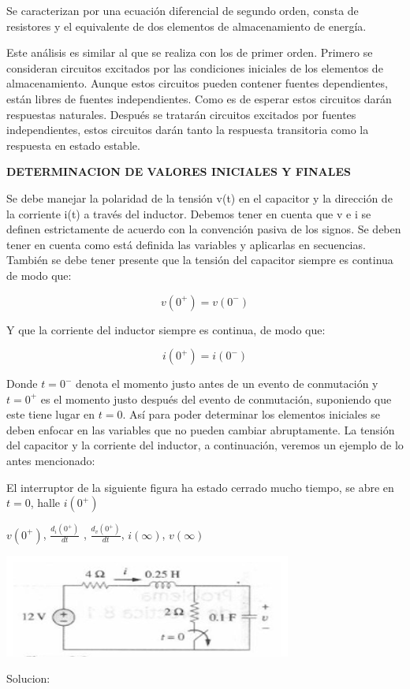 \documentclass[oneside,12pt]{report}
\begin{document}
Se caracterizan por una ecuación diferencial de segundo orden, consta de resistores y el equivalente de dos elementos de almacenamiento de energía.

Este análisis es similar al que se realiza con los de primer orden. Primero se consideran circuitos excitados por las condiciones iniciales de los elementos de almacenamiento. Aunque estos circuitos pueden contener fuentes dependientes, están libres de fuentes independientes. Como es de esperar estos circuitos darán respuestas naturales. Después se tratarán circuitos excitados por fuentes independientes, estos circuitos darán tanto la respuesta transitoria como la respuesta en estado estable.

\begin{center}
	\textbf{DETERMINACION DE VALORES INICIALES Y FINALES}
\end{center}
Se debe manejar la polaridad de la tensión v(t) en el capacitor y la dirección de la corriente i(t) a través del inductor. Debemos tener en cuenta que v e i se definen estrictamente de acuerdo con la convención pasiva de los signos. Se deben tener en cuenta como está definida las variables y aplicarlas en secuencias.
También se debe tener presente que la tensión del capacitor siempre es continua de modo que:

$$v(0^{+})=v(0^{-})$$

Y que la corriente del inductor siempre es continua, de modo que:

$$i(0^{+})=i(0^{-})$$ 

Donde $t=0^{-}$ denota el momento justo antes de un evento de conmutación y $t=0^{+}$ es el momento justo después del evento de conmutación, suponiendo que este tiene lugar en $t=0$.
Así para poder determinar los elementos iniciales se deben enfocar en las variables que no pueden cambiar abruptamente. La tensión del capacitor y la corriente del inductor, a continuación, veremos un ejemplo de lo antes mencionado:

El interruptor de la siguiente figura ha estado cerrado mucho tiempo, se abre en  $t=0$, halle $i(0^{+} )$

$v(0^{+})$, $\frac{d_i(0^{+})}{dt}$ , $\frac{d_v(0^{+})}{dt}$, $i(\infty)$, $v(\infty)$
\begin{center}
	\includegraphics[width=0.7\linewidth]{circuitoejer}
\end{center}
Solucion:
\end{document}
